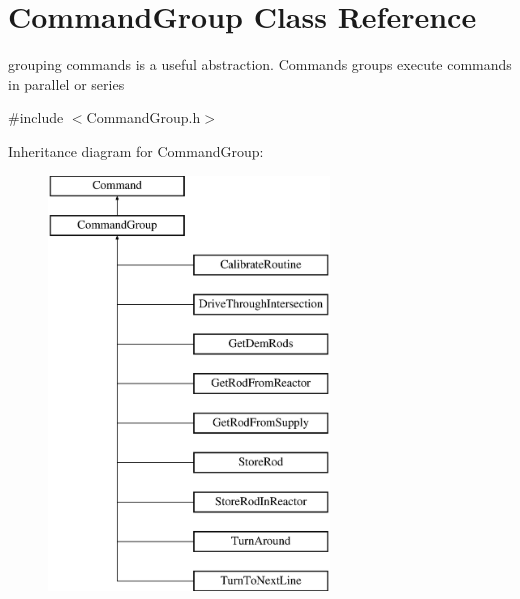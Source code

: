 \hypertarget{classCommandGroup}{\section{Command\-Group Class Reference}
\label{classCommandGroup}
}


grouping commands is a useful abstraction. Commands groups execute commands in parallel or series  




{\ttfamily \#include $<$Command\-Group.\-h$>$}

Inheritance diagram for Command\-Group\-:\begin{figure}[H]
\begin{center}
\leavevmode
\includegraphics[height=11.000000cm]{classCommandGroup}
\end{center}
\end{figure}

